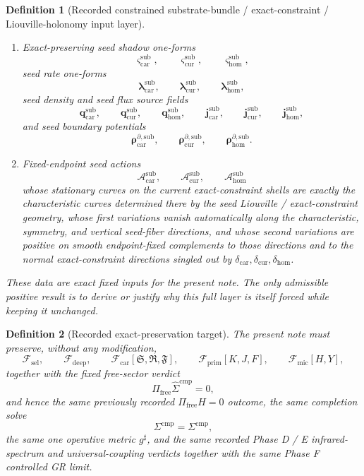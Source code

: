 \documentclass[11pt]{article}
\newcommand{\CompletedMetric}{g^{\sharp}}
\newcommand{\CompShift}{\Sigma^{\mathrm{cmp}}}
\newcommand{\CompLift}{\widehat\Sigma^{\mathrm{cmp}}}
\newcommand{\FreeProj}{\Pi_{\mathrm{free}}}
\newcommand{\GaugeAux}{Y}
\newcommand{\MicFunctional}{\mathscr F_{\mathrm{mic}}}
\newcommand{\PrimFunctional}{\mathscr F_{\mathrm{prim}}}
\newcommand{\CarrierFunctional}{\mathscr F_{\mathrm{car}}}
\newcommand{\DeepFunctional}{\mathscr F_{\mathrm{deep}}}
\newcommand{\StemFunctional}{\mathscr F_{\mathrm{sel}}}
\newcommand{\PrimStrain}{K}
\newcommand{\PrimNeutral}{J}
\newcommand{\PrimFree}{F}
\newcommand{\CarrierSeed}{\mathfrak S}
\newcommand{\RelabelSeed}{\mathfrak R}
\newcommand{\FreeSeed}{\mathfrak F}
\newcommand{\TensorConstraintGap}{\delta_{\mathrm{car}}}
\newcommand{\CurConstraintGap}{\delta_{\mathrm{cur}}}
\newcommand{\HomConstraintGap}{\delta_{\mathrm{hom}}}
\newcommand{\TensorSeedShadowForm}{\boldsymbol{\varsigma}_{\mathrm{car}}^{\mathrm{sub}}}
\newcommand{\CurSeedShadowForm}{\boldsymbol{\varsigma}_{\mathrm{cur}}^{\mathrm{sub}}}
\newcommand{\HomSeedShadowForm}{\boldsymbol{\varsigma}_{\mathrm{hom}}^{\mathrm{sub}}}
\newcommand{\TensorSeedRateForm}{\boldsymbol{\lambda}_{\mathrm{car}}^{\mathrm{sub}}}
\newcommand{\CurSeedRateForm}{\boldsymbol{\lambda}_{\mathrm{cur}}^{\mathrm{sub}}}
\newcommand{\HomSeedRateForm}{\boldsymbol{\lambda}_{\mathrm{hom}}^{\mathrm{sub}}}
\newcommand{\TensorSeedDensitySource}{\boldsymbol{q}_{\mathrm{car}}^{\mathrm{sub}}}
\newcommand{\CurSeedDensitySource}{\boldsymbol{q}_{\mathrm{cur}}^{\mathrm{sub}}}
\newcommand{\HomSeedDensitySource}{\boldsymbol{q}_{\mathrm{hom}}^{\mathrm{sub}}}
\newcommand{\TensorSeedFluxSource}{\boldsymbol{j}_{\mathrm{car}}^{\mathrm{sub}}}
\newcommand{\CurSeedFluxSource}{\boldsymbol{j}_{\mathrm{cur}}^{\mathrm{sub}}}
\newcommand{\HomSeedFluxSource}{\boldsymbol{j}_{\mathrm{hom}}^{\mathrm{sub}}}
\newcommand{\TensorSeedBoundarySource}{\boldsymbol{\rho}_{\mathrm{car}}^{\partial,\mathrm{sub}}}
\newcommand{\CurSeedBoundarySource}{\boldsymbol{\rho}_{\mathrm{cur}}^{\partial,\mathrm{sub}}}
\newcommand{\HomSeedBoundarySource}{\boldsymbol{\rho}_{\mathrm{hom}}^{\partial,\mathrm{sub}}}
\newcommand{\TensorSeedAction}{\mathscr A_{\mathrm{car}}^{\mathrm{sub}}}
\newcommand{\CurSeedAction}{\mathscr A_{\mathrm{cur}}^{\mathrm{sub}}}
\newcommand{\HomSeedAction}{\mathscr A_{\mathrm{hom}}^{\mathrm{sub}}}
\newtheorem{definition}{Definition}
\begin{document}
\begin{definition}[Recorded constrained substrate-bundle / exact-constraint / Liouville-holonomy input layer]
\begin{enumerate}
    \item Exact-preserving seed shadow one-forms
    \[
    \TensorSeedShadowForm,\qquad
    \CurSeedShadowForm,\qquad
    \HomSeedShadowForm,
    \]
    seed rate one-forms
    \[
    \TensorSeedRateForm,\qquad
    \CurSeedRateForm,\qquad
    \HomSeedRateForm,
    \]
    seed density and seed flux source fields
    \[
    \TensorSeedDensitySource,\qquad
    \CurSeedDensitySource,\qquad
    \HomSeedDensitySource,\qquad
    \TensorSeedFluxSource,\qquad
    \CurSeedFluxSource,\qquad
    \HomSeedFluxSource,
    \]
    and seed boundary potentials
    \[
    \TensorSeedBoundarySource,\qquad
    \CurSeedBoundarySource,\qquad
    \HomSeedBoundarySource.
    \]
    \item Fixed-endpoint seed actions
    \[
    \TensorSeedAction,\qquad
    \CurSeedAction,\qquad
    \HomSeedAction
    \]
    whose stationary curves on the current exact-constraint shells are exactly the characteristic curves determined there by the seed Liouville / exact-constraint geometry, whose first variations vanish automatically along the characteristic, symmetry, and vertical seed-fiber directions, and whose second variations are positive on smooth endpoint-fixed complements to those directions and to the normal exact-constraint directions singled out by \(\TensorConstraintGap,\CurConstraintGap,\HomConstraintGap\).
\end{enumerate}
These data are exact fixed inputs for the present note. The only admissible positive result is to derive or justify why this full layer is itself forced while keeping it unchanged.
\end{definition}

\begin{definition}[Recorded exact-preservation target]
\label{def:recorded_target}
The present note must preserve, without any modification,
\begin{equation}
\StemFunctional,
\qquad
\DeepFunctional,
\qquad
\CarrierFunctional[\CarrierSeed,\RelabelSeed,\FreeSeed],
\qquad
\PrimFunctional[\PrimStrain,\PrimNeutral,\PrimFree],
\qquad
\MicFunctional[H,\GaugeAux],
\label{eq:target_functionals}
\end{equation}
together with the fixed free-sector verdict
\begin{equation}
\FreeProj\CompLift=0,
\label{eq:target_free}
\end{equation}
and hence the same previously recorded \(\Pi_{\mathrm{free}}H=0\) outcome, the same completion solve
\begin{equation}
\CompShift=\Sigma^{\mathrm{cmp}},
\label{eq:target_sigma}
\end{equation}
the same one operative metric \(\CompletedMetric\), and the same recorded Phase D / E infrared-spectrum and universal-coupling verdicts together with the same Phase F controlled GR limit.
\end{definition}
\end{document}

